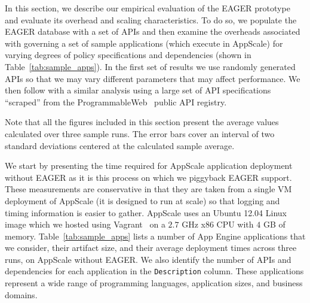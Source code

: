 In this section, we describe our empirical evaluation of the EAGER
prototype and evaluate its overhead and scaling characteristics.
To do so, we populate the EAGER database with a set of APIs and then examine
the overheads associated with governing a set of sample applications (which
execute in AppScale) for varying degrees of policy specifications and
dependencies (shown in Table~\ref{tab:sample_apps}).
In the first set of results we use randomly generated APIs so that we may vary
different parameters that may affect performance.  We then follow with a
similar analysis using a large
set of API specifications ``scraped'' from the ProgrammableWeb~\cite{pweb}
public API registry.

Note that all the figures included in this section present the average values calculated
over three sample runs. The error bars cover an interval of two standard deviations centered
at the calculated sample average.
 
We start by presenting the time required for AppScale application deployment
without EAGER as it is this process on which we piggyback EAGER support.  
These measurements are conservative in that they are taken 
from a single VM deployment of AppScale (it is designed to run at scale) so that
logging and timing information is easier to gather.  AppScale uses an
Ubuntu 12.04 Linux image which we hosted using Vagrant~\cite{vagrant}    
on a $2.7$ GHz x86 CPU with $4$ GB of memory.
Table~\ref{tab:sample_apps} lists a number of App Engine
applications that we consider, their artifact size, and their average deployment times 
across three runs, on AppScale without EAGER.
We also identify the number of APIs and dependencies for each 
application in the \texttt{Description} column.
These applications represent a wide range of programming languages,
application sizes, and business domains.  

